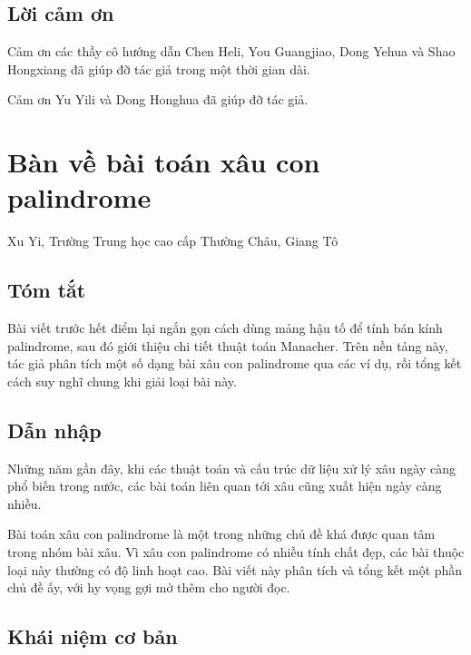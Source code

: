 \documentclass[11pt]{article}
\begin{document}
\subsection{Lời cảm ơn}

Cảm ơn các thầy cô hướng dẫn Chen Heli, You Guangjiao, Dong Yehua và Shao
Hongxiang đã giúp đỡ tác giả trong một thời gian dài.

Cảm ơn Yu Yili và Dong Honghua đã giúp đỡ tác giả.

\section{Bàn về bài toán xâu con palindrome}

\begin{center}
Xu Yi, Trường Trung học cao cấp Thường Châu, Giang Tô
\end{center}

\subsection*{Tóm tắt}

Bài viết trước hết điểm lại ngắn gọn cách dùng mảng hậu tố để tính bán kính
palindrome, sau đó giới thiệu chi tiết thuật toán Manacher. Trên nền tảng này,
tác giả phân tích một số dạng bài xâu con palindrome qua các ví dụ, rồi tổng
kết cách suy nghĩ chung khi giải loại bài này.

\subsection{Dẫn nhập}

Những năm gần đây, khi các thuật toán và cấu trúc dữ liệu xử lý xâu ngày càng
phổ biến trong nước, các bài toán liên quan tới xâu cũng xuất hiện ngày càng
nhiều.

Bài toán xâu con palindrome là một trong những chủ đề khá được quan tâm trong
nhóm bài xâu. Vì xâu con palindrome có nhiều tính chất đẹp, các bài thuộc loại
này thường có độ linh hoạt cao. Bài viết này phân tích và tổng kết một phần chủ
đề ấy, với hy vọng gợi mở thêm cho người đọc.

\subsection{Khái niệm cơ bản}
\end{document}
